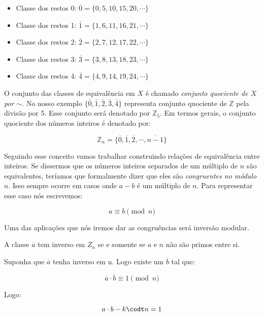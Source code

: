 	\begin{itemize}
		\item Classe dos restos 0: $\overline{0}=\{0, 5, 10, 15, 20, \cdots\}$
		\item Classe dos restos 1: $\overline{1}=\{1, 6, 11, 16, 21, \cdots\}$
		\item Classe dos restos 2: $\overline{2}=\{2, 7, 12, 17, 22, \cdots\}$
		\item Classe dos restos 3: $\overline{3}=\{3, 8, 13, 18, 23, \cdots\}$
		\item Classe dos restos 4: $\overline{4}=\{4, 9, 14, 19, 24, \cdots\}$
	\end{itemize}

O conjunto das classes de equival\^encia em $X$ \'e chamado \textit{conjunto quociente de $X$ por $\sim$}. No nosso exemplo $\{\bar{0}, \bar{1}, \bar{2}, \bar{3}, \bar{4}\}$ representa conjunto quociente de $\mathbb{Z}$ pela divis\~ao por 5. Esse conjunto ser\'a denotado por $\mathbb{Z}_{5}$. Em termos gerais, o conjunto quociente dos n\'umeros inteiros \'e denotado por:

$$\mathbb{Z}_{n}=\{\overline{0}, \overline{1}, \overline{2}, \cdots, \overline{n-1}\}$$ 

Seguindo esse conceito vamos trabalhar construindo rela\c{c}\~oes de equival\^encia entre inteiros. Se dissermos que os n\'umeros inteiros separados de um m\'ultiplo de $n$ s\~ao equivalentes, ter\'iamos que formalmente dizer que eles s\~ao \textit{congruentes no m\'odulo $n$}. Isso sempre ocorre em casos onde $a-b$ \'e um m\'ultiplo de $n$. Para representar esse caso n\'os escrevemos:

$$a \equiv b \pmod{n}$$ 

Uma das aplica\c{c}\~oes que n\'os iremos dar as congru\^encias ser\'a invers\~ao modular. 

\begin{Th}\label{inversao}
A classe $\overline{a}$ tem inverso em $Z_n$ se e somente se $a$ e $n$ n\~ao s\~ao primos entre si.
\end{Th}

\newline
Suponha que $\overline{a}$ tenha inverso em n. Logo existe um $\overline{b}$ tal que:

$$\overline{a} \cdot \overline{b} \equiv 1 \pmod{n}$$

Logo:

$$a \cdot b - k \codt n = 1 $$

